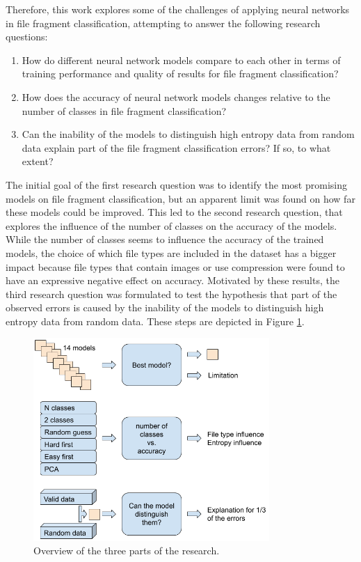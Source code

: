 
Therefore, this work explores some of the challenges of applying neural networks in file fragment classification, attempting to answer the following research questions:

\begin{enumerate}[itemindent=\parindent,label=\textbf{Q\arabic*.}]

    \item How do different neural network models compare to each other in terms of training performance and quality of results for file fragment classification?
    
    \item How does the accuracy of neural network models changes relative to the number of classes in file fragment classification?

    \item Can the inability of the models to distinguish high entropy data from random data explain part of the file fragment classification errors? If so, to what extent?
\end{enumerate}

The initial goal of the first research question was to identify the most promising models on file fragment classification, but an apparent limit was found on how far these models could be improved. This led to the second research question, that explores the influence of the number of classes on the accuracy of the models. While the number of classes seems to influence the accuracy of the trained models, the choice of which file types are included in the dataset has a bigger impact because file types that contain images or use compression were found to have an expressive negative effect on accuracy.
Motivated by these results, the third research question was formulated to test the hypothesis that part of the observed errors is caused by the inability of the models to distinguish high entropy data from random data. These steps are depicted in Figure \ref{fig:steps}.


\noindent
\begin{figure}[htb!]
\centering\includegraphics[width=0.8\textwidth]{content/3phases.png}
\caption[Research parts]{\label{fig:steps}Overview of the three parts of the research.}%
\end{figure}

